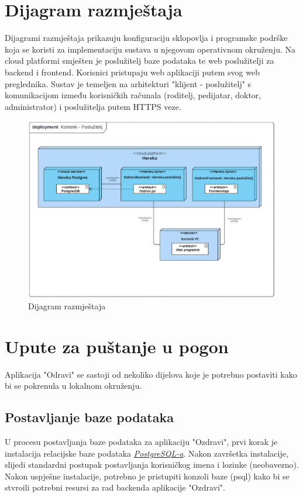 		\section{Dijagram razmještaja}
			Dijagrami razmještaja prikazuju konfiguraciju sklopovlja i programske podrške koja se koristi za implementaciju sustava u njegovom operativnom okruženju. Na cloud platformi smješten je poslužitelj baze podataka te web poslužitelji za backend i frontend. Korisnici pristupaju web aplikaciji putem svog web preglednika. Sustav je temeljen na arhitekturi "klijent - poslužitelj" s komunikacijom između korisničkih računala (roditelj, pedijatar, doktor, administrator) i poslužitelja putem HTTPS veze.
			\begin{figure}[H]
				\includegraphics[width=\textwidth]{slike/deploymentDiagram.png} 
				\caption{Dijagram razmještaja} 
			\end{figure}
			\eject 
		
		\section{Upute za puštanje u pogon}
			Aplikacija "Odravi" se sastoji od nekoliko dijelova koje je potrebno postaviti kako bi se pokrenula u lokalnom okruženju.
		
			\subsection*{Postavljanje baze podataka}
			U procesu postavljanja baze podataka za aplikaciju "Ozdravi", prvi korak je instalacija relacijske baze podataka
			\href{https://www.postgresql.org/download/}{\textit{PostgreSQL-a}}. Nakon završetka instalacije, slijedi standardni postupak postavljanja korisničkog imena i lozinke (neobavezno).
			Nakon uspješne instalacije, potrebno je pristupiti konzoli baze (psql) kako bi se stvroili potrebni resursi za rad backenda aplikacije "Ozdravi".
	
